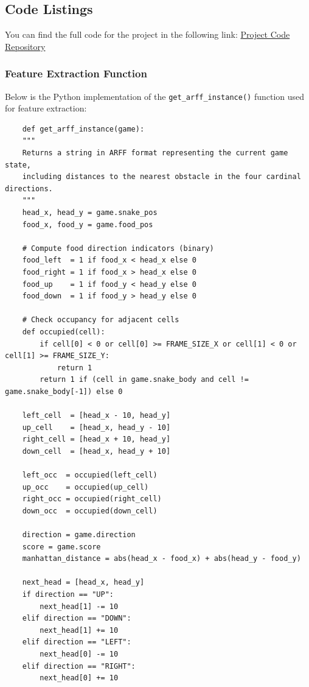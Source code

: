 \documentclass[12pt,a4paper]{article}
\begin{document}
\subsection{Code Listings}

You can find the full code for the project in the following link:
\href{https://github.com/carlos1302-ai/projec1_ml}{Project Code Repository}


\subsubsection{Feature Extraction Function}
\label{sec:feature-extraction}

Below is the Python implementation of the \texttt{get\_arff\_instance()} function used for feature extraction:

\begin{verbatim}
    def get_arff_instance(game):
    """
    Returns a string in ARFF format representing the current game state,
    including distances to the nearest obstacle in the four cardinal directions.
    """
    head_x, head_y = game.snake_pos
    food_x, food_y = game.food_pos

    # Compute food direction indicators (binary)
    food_left  = 1 if food_x < head_x else 0
    food_right = 1 if food_x > head_x else 0
    food_up    = 1 if food_y < head_y else 0
    food_down  = 1 if food_y > head_y else 0

    # Check occupancy for adjacent cells
    def occupied(cell):
        if cell[0] < 0 or cell[0] >= FRAME_SIZE_X or cell[1] < 0 or cell[1] >= FRAME_SIZE_Y:
            return 1
        return 1 if (cell in game.snake_body and cell != game.snake_body[-1]) else 0

    left_cell  = [head_x - 10, head_y]
    up_cell    = [head_x, head_y - 10]
    right_cell = [head_x + 10, head_y]
    down_cell  = [head_x, head_y + 10]

    left_occ  = occupied(left_cell)
    up_occ    = occupied(up_cell)
    right_occ = occupied(right_cell)
    down_occ  = occupied(down_cell)

    direction = game.direction
    score = game.score
    manhattan_distance = abs(head_x - food_x) + abs(head_y - food_y)

    next_head = [head_x, head_y]
    if direction == "UP":
        next_head[1] -= 10
    elif direction == "DOWN":
        next_head[1] += 10
    elif direction == "LEFT":
        next_head[0] -= 10
    elif direction == "RIGHT":
        next_head[0] += 10


\end{verbatim}
\end{document}
